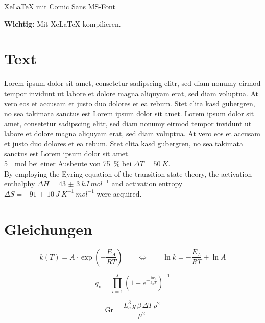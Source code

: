 \documentclass[12pt,a4paper]{article}
\begin{document}
\begin{center}\Large
XeLaTeX mit Comic Sans MS-Font
\end{center}

\begin{center}
\textbf{Wichtig:} Mit XeLaTeX kompilieren.
\end{center}

\section{Text}\sloppy
Lorem ipsum dolor sit amet, consetetur sadipscing elitr, sed diam nonumy eirmod tempor invidunt ut labore et dolore magna aliquyam erat, sed diam voluptua. At vero eos et accusam et justo duo dolores et ea rebum. Stet clita kasd gubergren, no sea takimata sanctus est Lorem ipsum dolor sit amet. Lorem ipsum dolor sit amet, consetetur sadipscing elitr, sed diam nonumy eirmod tempor invidunt ut labore et dolore magna aliquyam erat, sed diam voluptua. At vero eos et accusam et justo duo dolores et ea rebum. Stet clita kasd gubergren, no sea takimata sanctus est Lorem ipsum dolor sit amet.\\

\SI{5}{\mu mol} bei einer Ausbeute von \SI{75}{\%} bei $\Delta T=\SI{50}{K}$. \\

By employing the Eyring equation of the transition state theory, the activation enthalphy $\Delta H=\SI{43(3)}{kJ\:mol^{-1}}$ and activation entropy $\Delta S=\SI{-91(10)}{J\:K^{-1}\:mol^{-1}}$ were acquired.


\section{Gleichungen}
\begin{equation}
k(T)=A\cdot\exp\left(-\frac{E_A}{RT}\right)\qquad\Leftrightarrow\qquad \ln k=-\frac{E_A}{RT}+\ln A
\end{equation}

\begin{equation}
q_v=\prod_{i=1}^s\left(1-e^{-\frac{h\nu_i}{k_\textrm{B}T}}\right)^{-1}
\end{equation}

\begin{equation}
\textrm{Gr}=\frac{L_c^3\,g\,\beta\,\Delta T\,\rho^2}{\mu^2}
\end{equation}
\end{document}
